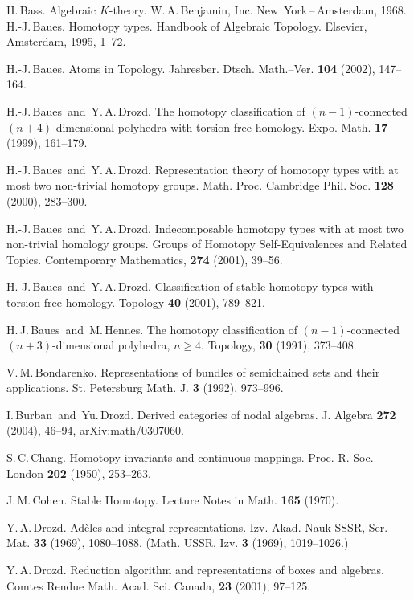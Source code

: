 \documentclass[12pt,a4paper]{amsart}
\theoremstyle{definition}
\theoremstyle{remark}
\numberwithin{equation}{section}
\begin{document}
 \begin{thebibliography}{99}
  H.\,Bass. Algebraic $K$-theory. W.\,A.\,Benjamin, Inc. New~York\,--\,Amsterdam, 1968.
 H.-J.\,Baues. Homotopy types. Handbook of Algebraic
 Topology. Elsevier, Amsterdam, 1995, 1--72. 

  H.-J.\,Baues. Atoms in
  Topology. Jahresber. Dtsch. Math.--Ver. {\bf104} (2002), 147--164. 

 H.-J.\,Baues~and~Y.\,A.\,Drozd.
 The homotopy classification of $(n -1)$-connected
 $(n + 4)$-dimensional polyhedra with torsion free homology. Expo. Math. {\bf17}
 (1999), 161--179.

 H.-J.\,Baues~and~Y.\,A.\,Drozd.
 Representation theory of homotopy types with at most two non-trivial homotopy groups.
 Math. Proc. Cambridge Phil. Soc. {\bf128} (2000), 283--300.
 
 H.-J.\,Baues~and~Y.\,A.\,Drozd.
 Indecomposable homotopy types with at most two non-trivial homology groups.
 Groups of Homotopy Self-Equivalences and Related Topics.
 Contemporary Mathematics, {\bf274} (2001), 39--56.

 H.-J.\,Baues~and~Y.\,A.\,Drozd.
 Classification of stable homotopy types with torsion-free homology.
 Topology {\bf40} (2001), 789--821.

 H.\,J.\,Baues~and~M.\,Hennes. The homotopy classification of
 $(n-1)$-connected $(n + 3)$-dimensional 
 polyhedra, $n \ge4$. Topology, {\bf 30} (1991), 373--408.

 V.\,M.\,Bondarenko.
 Representations of bundles of semichained sets and their
 applications. St. Petersburg Math. J. {\bf3} (1992), 973--996.

 I.\,Burban~and~Yu.\,Drozd. Derived categories of nodal algebras.
 J. Algebra {\bf272} (2004), 46--94, arXiv:math/0307060. 

 S.\,C.\,Chang. Homotopy invariants and continuous mappings. Proc. R. Soc. London
 {\bf202} (1950), 253--263. 
 
 J.\,M.\,Cohen. Stable Homotopy. Lecture Notes in Math. {\bf165} (1970).

  Y.\,A.\,Drozd.
 Ad\`eles and integral representations. 
Izv. Akad. Nauk SSSR, Ser. Mat. {\bf33} (1969), 1080--1088.
(Math. USSR, Izv. {\bf3} (1969), 1019--1026.)

 Y.\,A.\,Drozd.
 Reduction algorithm and representations of boxes and algebras.
 Comtes Rendue Math. Acad. Sci. Canada, {\bf23} (2001), 97--125.  


\end{thebibliography}
\end{document}
